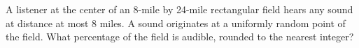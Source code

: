 A listener at the center of an 8-mile by 24-mile rectangular field hears any sound at distance at most 8 miles. A sound originates at a uniformly random point of the field. What percentage of the field is audible, rounded to the nearest integer?
